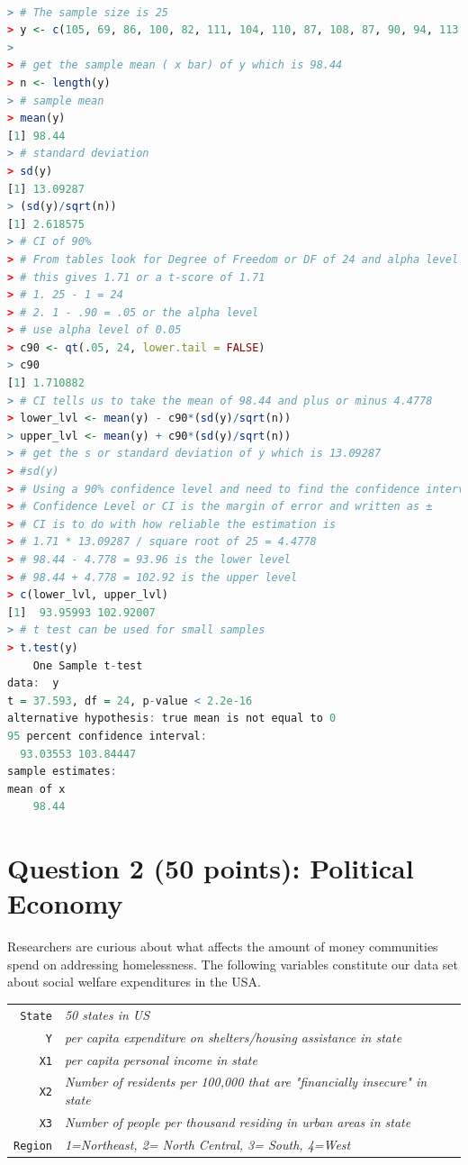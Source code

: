 \documentclass[12pt,letterpaper]{article}
\begin{document}
\begin{lstlisting}[language=R]

> # The sample size is 25
> y <- c(105, 69, 86, 100, 82, 111, 104, 110, 87, 108, 87, 90, 94, 113, 112, 98, 80, 97, 95, 111, 114, 89, 95, 126, 98)
> 
> # get the sample mean ( x bar) of y which is 98.44
> n <- length(y) 
> # sample mean
> mean(y)
[1] 98.44
> # standard deviation
> sd(y)
[1] 13.09287
> (sd(y)/sqrt(n))
[1] 2.618575
> # CI of 90%
> # From tables look for Degree of Freedom or DF of 24 and alpha level of 0.05
> # this gives 1.71 or a t-score of 1.71
> # 1. 25 - 1 = 24
> # 2. 1 - .90 = .05 or the alpha level
> # use alpha level of 0.05
> c90 <- qt(.05, 24, lower.tail = FALSE)
> c90
[1] 1.710882
> # CI tells us to take the mean of 98.44 and plus or minus 4.4778
> lower_lvl <- mean(y) - c90*(sd(y)/sqrt(n))
> upper_lvl <- mean(y) + c90*(sd(y)/sqrt(n))
> # get the s or standard deviation of y which is 13.09287
> #sd(y)
> # Using a 90% confidence level and need to find the confidence interval
> # Confidence Level or CI is the margin of error and written as ±
> # CI is to do with how reliable the estimation is
> # 1.71 * 13.09287 / square root of 25 = 4.4778
> # 98.44 - 4.778 = 93.96 is the lower level
> # 98.44 + 4.778 = 102.92 is the upper level
> c(lower_lvl, upper_lvl)
[1]  93.95993 102.92007
> # t test can be used for small samples
> t.test(y)
	One Sample t-test
data:  y
t = 37.593, df = 24, p-value < 2.2e-16
alternative hypothesis: true mean is not equal to 0
95 percent confidence interval:
  93.03553 103.84447
sample estimates:
mean of x 
    98.44 

\end{lstlisting}

\newpage

	\section*{Question 2 (50 points): Political Economy}

\noindent Researchers are curious about what affects the amount of money communities spend on addressing homelessness. The following variables constitute our data set about social welfare expenditures in the USA. \\
\vspace{.5cm}


\begin{tabular}{r|l}
	\texttt{State} &\emph{50 states in US} \\
	\texttt{Y} & \emph{per capita expenditure on shelters/housing assistance in state}\\
	\texttt{X1} &\emph{per capita personal income in state} \\
	\texttt{X2} &  \emph{Number of residents per 100,000 that are "financially insecure" in state}\\
	\texttt{X3} &  \emph{Number of people per thousand residing in urban areas in state} \\
	\texttt{Region} &  \emph{1=Northeast, 2= North Central, 3= South, 4=West} \\
\end{tabular}
\end{document}
